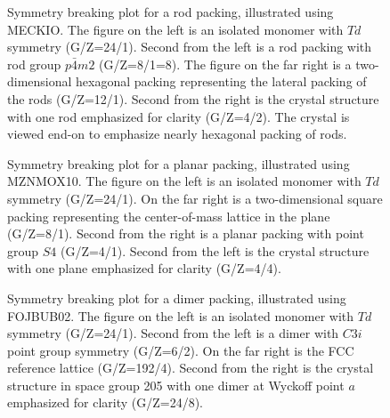 \documentclass{iucr}              %
\begin{document}
\begin{figure}
\caption{Symmetry breaking plot for a rod packing, illustrated using MECKIO.  The figure on the left is an isolated monomer with $Td$ symmetry (G/Z=24/1).  Second from the left is a rod packing with rod group $p\bar{4}m2$ (G/Z=8/1=8).  The figure on the far right is a two-dimensional hexagonal packing representing the lateral packing of the rods (G/Z=12/1).  Second from the right is the crystal structure with one rod emphasized for clarity (G/Z=4/2).  The crystal is viewed end-on to emphasize nearly hexagonal packing of rods.}
\label{fig_MECKIO}
\end{figure}

\begin{figure}
\caption{Symmetry breaking plot for a planar packing, illustrated using MZNMOX10.  The figure on the left is an isolated monomer with $Td$ symmetry (G/Z=24/1).  On the far right is a two-dimensional square packing representing the center-of-mass lattice in the plane (G/Z=8/1).  Second from the right is a planar packing with point group $S4$ (G/Z=4/1).  Second from the left is the crystal structure with one plane emphasized for clarity (G/Z=4/4).}
\label{fig_MZNMOX10}
\end{figure}

\begin{figure}
\caption{Symmetry breaking plot for a dimer packing, illustrated using FOJBUB02.  The figure on the left is an isolated monomer with $Td$ symmetry (G/Z=24/1).  Second from the left is a dimer with $C3i$ point group symmetry (G/Z=6/2).  On the far right is the FCC reference lattice (G/Z=192/4).  Second from the right is the crystal structure in space group 205 with one dimer at Wyckoff point $a$ emphasized for clarity (G/Z=24/8).}
\label{fig_FOJBUB02}
\end{figure}
\end{document}
